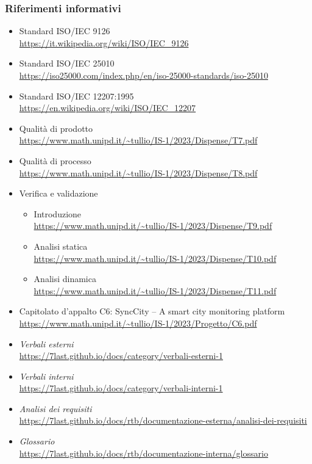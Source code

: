 \subsubsection{Riferimenti informativi}
\begin{itemize}
    \item Standard ISO/IEC 9126 \\
        \url{https://it.wikipedia.org/wiki/ISO/IEC_9126}
    \item Standard ISO/IEC 25010 \\
        \url{https://iso25000.com/index.php/en/iso-25000-standards/iso-25010}
    \item Standard ISO/IEC 12207:1995 \\
        \url{https://en.wikipedia.org/wiki/ISO/IEC_12207}
    \item Qualità di prodotto \\
        \url{https://www.math.unipd.it/~tullio/IS-1/2023/Dispense/T7.pdf}
    \item Qualità di processo \\
        \url{https://www.math.unipd.it/~tullio/IS-1/2023/Dispense/T8.pdf}
    \item Verifica e validazione
        \begin{itemize}
            \item Introduzione \\
                \url{https://www.math.unipd.it/~tullio/IS-1/2023/Dispense/T9.pdf}
            \item Analisi statica \\
                \url{https://www.math.unipd.it/~tullio/IS-1/2023/Dispense/T10.pdf}
            \item Analisi dinamica \\
                \url{https://www.math.unipd.it/~tullio/IS-1/2023/Dispense/T11.pdf}
        \end{itemize}
    \item Capitolato d'appalto C6: SyncCity – A smart city monitoring platform\\
        \url{https://www.math.unipd.it/~tullio/IS-1/2023/Progetto/C6.pdf}
    \item \textit{Verbali esterni} \\
        \url{https://7last.github.io/docs/category/verbali-esterni-1}
    \item \textit{Verbali interni} \\
        \url{https://7last.github.io/docs/category/verbali-interni-1}
    \item \textit{Analisi dei requisiti} \\
        \url{https://7last.github.io/docs/rtb/documentazione-esterna/analisi-dei-requisiti}
    \item \textit{Glossario} \\
        \url{https://7last.github.io/docs/rtb/documentazione-interna/glossario}
\end{itemize}